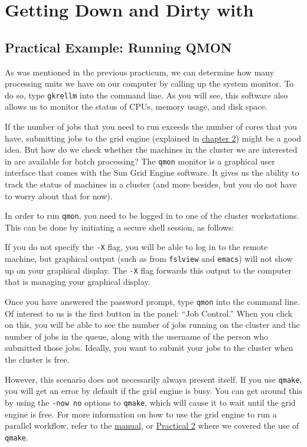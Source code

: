 \chapter{Getting Down and Dirty with \maken{}}
\label{sec:practicum3}

\section{Practical Example: Running QMON}
As was mentioned in the previous practicum, we can determine how many processing units we have on our computer by calling up the system monitor. To do so, type \texttt{gkrellm} into the command line. As you will see, this software also allows us to monitor the status of CPUs, memory usage, and disk space. 

If the number of jobs that you need to run exceeds the number of cores that you have, submitting jobs to the grid engine (explained in \hyperref[sec:gridengine]{chapter 2}) might be a good idea. But how do we check whether the machines in the cluster we are interested in are available for batch processing? The \texttt{qmon} monitor is a graphical user interface that comes with the Sun Grid Engine software. It gives us the ability to track the status of machines in a cluster (and more besides, but you do not have to worry about that for now). 

In order to run \texttt{qmon}, you need to be logged in to one of the cluster workstations. This can be done by initiating a secure shell session, as follows:

If you do not specify the \texttt{-X} flag, you will be able to log in to the remote machine, but graphical output (such as from \texttt{fslview} and \texttt{emacs}) will not show up on your graphical display. The \texttt{-X} flag forwards this output to the computer that is managing your graphical display. 

Once you have answered the password prompt, type \texttt{qmon} into the command line. Of interest to us is the first button in the panel: ``Job Control.'' When you click on this, you will be able to see the number of jobs running on the cluster and the number of jobs in the queue, along with the username of the person who submitted those jobs. Ideally, you want to submit your jobs to the cluster when the cluster is free. 

However, this scenario does not necessarily always present itself. If you use \texttt{qmake}, you will get an error by default if the grid engine is busy. You can get around this by using the \texttt{-now no} options to \texttt{qmake}, which will cause it to wait until the grid engine is free. For more information on how to use the grid engine to run a parallel \maken{} workflow, refer to the \hyperref[sec:gridengine]{manual}, or \hyperref[practicum2]{Practical 2} where we covered the use of \texttt{qmake}. 

